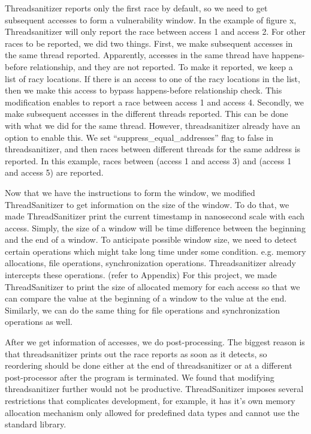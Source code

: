 \documentclass{acm_proc_article-sp}
\begin{document}
Threadsanitizer reports only the first race by default, so we need to get subsequent accesses to form a vulnerability window. In the example of figure x, Threadsanitizer will only report the race between access 1 and access 2. For other races to be reported, we did two things. First, we make subsequent accesses in the same thread reported. Apparently, accesses in the same thread have happens-before relationship, and they are not reported. To make it reported, we keep a list of racy locations. If there is an access to one of the racy locations in the list, then we make this access to bypass happens-before relationship check. This modification enables to report a race between access 1 and access 4. Secondly, we make subsequent accesses in the different threads reported. This can be done with what we did for the same thread. However, threadsanitizer already have an option to enable this. We set  “suppress\_equal\_addresses” flag to false in threadsanitizer, and then races between different threads for the same address is reported. In this example, races between (access 1 and access 3) and (access 1 and access 5) are reported.

Now that we have the instructions to form the window, we modified ThreadSanitizer to get information on the size of the window. To do that, we made ThreadSanitizer print the current timestamp in nanosecond scale with each access. Simply, the size of a window will be time difference between the beginning and the end of a window. To anticipate possible window size, we need to detect certain operations which might take long time under some condition. e.g. memory allocations, file operations, synchronization operations. Threadsanitizer already intercepts these operations. (refer to Appendix) For this project, we made ThreadSanitizer to print the size of allocated memory for each access so that we can compare the value at the beginning of a window to the value at the end. Similarly, we can do the same thing for file operations and synchronization operations as well.

After we get information of accesses, we do post-processing. The biggest reason is that threadsanitizer prints out the race reports as soon as it detects, so reordering should be done either at the end of threadsanitizer or at a different post-processor after the program is terminated. We found that modifying threadsanitizer further would not be productive. ThreadSanitizer imposes several restrictions that complicates development, for example, it has it’s own memory allocation mechanism only allowed for predefined data types and cannot use the standard library. 
\end{document}
